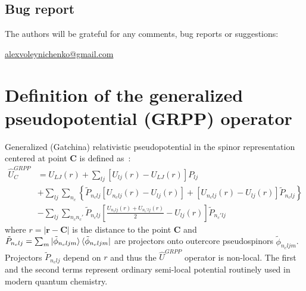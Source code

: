 \documentclass[12pt]{article}
\begin{document}
\subsection{Bug report}

The authors will be grateful for any comments, bug reports or suggestions:

\noindent
\href{mailto:alexvoleynichenko@gmail.com}{alexvoleynichenko@gmail.com}

\section{Definition of the generalized pseudopotential (GRPP) operator}

Generalized (Gatchina) relativistic pseudopotential in the spinor representation centered at point $\bm{C}$ is
defined as~\cite{Titov:99}:
%
\begin{align}
\hat{U}^{GRPP}_{C} &= U_{LJ}(r) + \sum_{lj} \left[ U_{lj}(r) - U_{LJ}(r) \right] P_{lj} \nonumber \\
&+ \sum_{lj} \sum_{n_c}
\left\{
\tilde{P}_{n_clj}
\left[ U_{n_clj}(r) - U_{lj}(r)\right] +
\left[U_{n_clj}(r) - U_{lj}(r)\right] \tilde{P}_{n_clj}
\right\}
\label{eq:grpp-def} \\
&- \sum_{lj} \sum_{n_cn_c'} \tilde{P}_{n_clj}
\left[\frac{U_{n_clj}(r) + U_{n_c'lj}(r)}{2} - U_{lj}(r) \right] \tilde{P}_{n_c'lj} \nonumber
\end{align}
%
where $r = |\bm{r} - \bm{C}|$ is the distance to the point $\bm{C}$ and $\tilde{P}_{n_clj} = \sum_{m} \ket{\tilde{\phi}_{n_cljm}} \bra{\tilde{\phi}_{n_cljm}}$ are projectors onto outercore pseudospinors $\tilde{\phi}_{n_cljm}$. Projectors $\tilde{P}_{n_clj}$ depend on $r$ and thus the $\hat{U}^{GRPP}$ operator is non-local. The first and the second terms represent ordinary semi-local potential routinely used in modern quantum chemistry.
\end{document}
